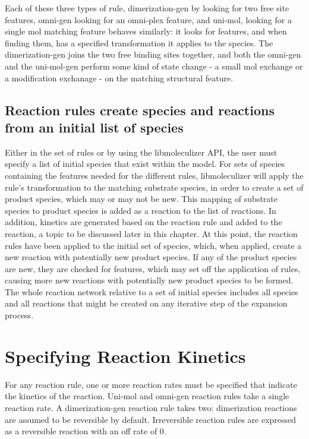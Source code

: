 Each of these three types of rule, dimerization-gen by looking for two
free site features, omni-gen looking for an omni-plex feature, and
uni-mol, looking for a single mol matching feature behaves similarly:
it looks for features, and when finding them, has a specified
transformation it applies to the species.  The dimerization-gen joins
the two free binding sites together, and both the omni-gen and the
uni-mol-gen perform some kind of state change - a small mol exchange
or a modification exchanage - on the matching structural feature.

\subsection{Reaction rules create species and reactions from an
  initial list of species}

Either in the set of rules or by using the libmoleculizer API, the
user must specify a list of initial species that exist within the
model. For sets of species containing the features needed for the
different rules, libmoleculizer will apply the rule's transformation
to the matching substrate species, in order to create a set of product
species, which may or may not be new.  This mapping of substrate
species to product species is added as a reaction to the list of
reactions.  In addition, kinetics are generated based on the reaction
rule and added to the reaction, a topic to be discussed later in this
chapter. At this point, the reaction rules have been applied to the
initial set of species, which, when applied, create a new reaction
with potentially new product species.  If any of the product species
are new, they are checked for features, which may set off the
application of rules, causing more new reactions with potentially new
product species to be formed.  The whole reaction network relative to
a set of initial species includes all species and all reactions that
might be created on any iterative step of the expansion process.  

\section{Specifying Reaction Kinetics} 

For any reaction rule, one or more reaction rates must be specified
that indicate the kinetics of the reaction.  Uni-mol and omni-gen
reaction rules take a single reaction rate.  A dimerization-gen
reaction rule takes two: dimerization reactions are assumed to be
reversible by default.  Irreversible reaction rules are expressed as a
reversible reaction with an off rate of 0.  

